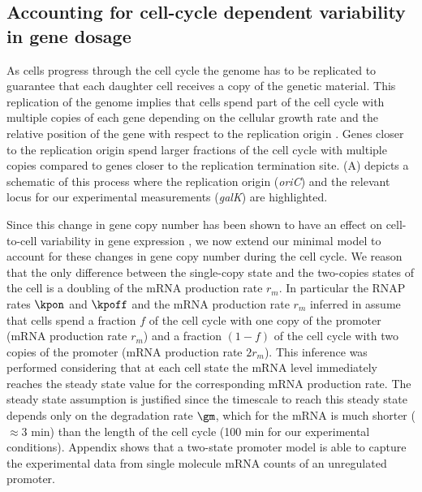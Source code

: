 \subsection{Accounting for cell-cycle dependent variability in gene dosage}
\label{sec_cell_cycle}

As cells progress through the cell cycle the genome has to be replicated to
guarantee that each daughter cell receives a copy of the genetic material.
This replication of the genome implies that cells spend part of the cell cycle
with multiple copies of each gene depending on the cellular growth rate and the
relative position of the gene with respect to the replication origin
\cite{Bremer1996}. Genes closer to the replication origin spend larger fractions
of the cell cycle with multiple copies compared to genes closer to the
replication termination site. (A) depicts a schematic of
this process where the replication origin ({\it oriC}) and the relevant locus
for our experimental measurements ({\it galK}) are highlighted.

Since this change in gene copy number has been shown to have an effect on
cell-to-cell variability in gene expression \cite{Jones2014a, Peterson2015}, we
now extend our minimal model to account for these changes in gene copy number
during the cell cycle.  We reason that the only difference between the
single-copy state and the two-copies states of the cell is a doubling of the
mRNA production rate $r_m$. In particular the RNAP rates $\kpon$ and $\kpoff$
and the mRNA production rate $r_m$ inferred in 
assume that cells spend a fraction $f$ of the cell cycle  with one copy of the
promoter (mRNA production rate $r_m$) and a fraction $(1-f)$ of the cell cycle
with two copies of the promoter (mRNA production rate $2 r_m$). This inference
was performed considering that at each cell state the mRNA level immediately
reaches the steady state value for the corresponding mRNA production rate. The
steady state assumption is justified since the timescale to reach this steady
state depends only on the degradation rate $\gm$, which for the mRNA  is much
shorter ($\approx 3$ min) than the length of the cell cycle (100 min for our
experimental conditions). Appendix 
shows that  a two-state promoter model is able to capture the experimental data
from single molecule mRNA counts of an unregulated promoter.


